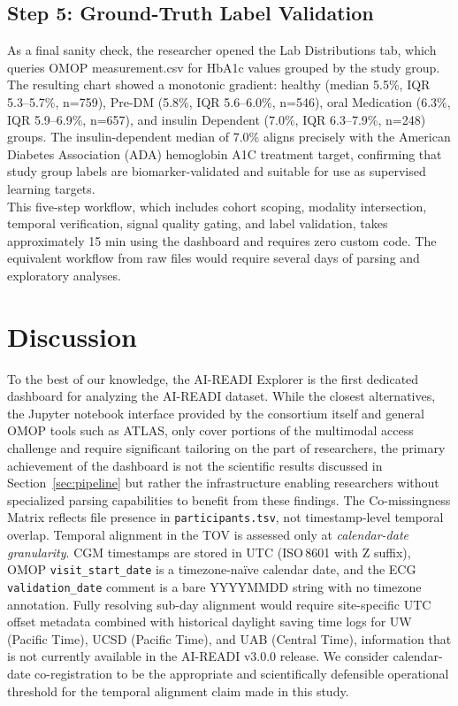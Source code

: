 \documentclass[conference]{IEEEtran}
\begin{document}
\subsection{Step 5: Ground-Truth Label Validation}
As a final sanity check, the researcher opened the Lab Distributions tab, which queries OMOP measurement.csv for HbA1c values grouped by the study group. The resulting chart showed a monotonic gradient: healthy (median 5.5\%, IQR 5.3--5.7\%, n=759), Pre-DM (5.8\%, IQR 5.6--6.0\%, n=546), oral Medication (6.3\%, IQR 5.9--6.9\%, n=657), and insulin Dependent (7.0\%, IQR 6.3--7.9\%, n=248) groups. The insulin-dependent median of 7.0\% aligns precisely with the American Diabetes Association (ADA) hemoglobin A1C treatment target, confirming that study group labels are biomarker-validated and suitable for use as supervised learning targets.
\\
This five-step workflow, which includes cohort scoping, modality intersection, temporal verification, signal quality gating, and label validation, takes approximately 15 min using the dashboard and requires zero custom code. The equivalent workflow from raw files would require several days of parsing and exploratory analyses.

\section{Discussion}
\label{sec:discussions}
To the best of our knowledge, the AI-READI Explorer is the first dedicated dashboard for analyzing the AI-READI dataset. While the closest alternatives, the Jupyter notebook interface provided by the consortium itself and general OMOP tools such as ATLAS, only cover portions of the multimodal access challenge and require significant tailoring on the part of researchers, the primary achievement of the dashboard is not the scientific results discussed in Section~\ref{sec:pipeline} but rather the infrastructure enabling researchers without specialized parsing capabilities to benefit from these findings. The Co-missingness Matrix reflects file presence in \texttt{participants.tsv}, not timestamp-level temporal overlap. Temporal alignment in the TOV is assessed only at \textit{calendar-date granularity}. CGM timestamps are stored in UTC (ISO\,8601 with Z suffix), OMOP \texttt{visit\_start\_date} is a timezone-naïve calendar date, and the ECG \texttt{validation\_date} comment is a bare YYYYMMDD string with no timezone annotation. Fully resolving sub-day alignment would require site-specific UTC offset metadata combined with historical daylight saving time logs for UW (Pacific Time), UCSD (Pacific Time), and UAB (Central Time), information that is not currently available in the AI-READI v3.0.0 release. We consider calendar-date co-registration to be the appropriate and scientifically defensible operational threshold for the temporal alignment claim made in this study.
\end{document}
